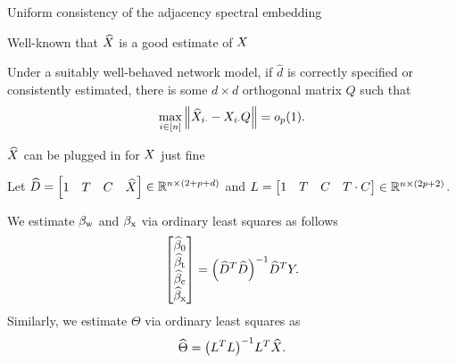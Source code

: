 \documentclass{beamer}
\theoremstyle{remark}
\begin{document}
\begin{frame}{Uniform consistency of the adjacency spectral embedding}

    Well-known that $\widehat{X}$ is a good estimate of $X$

    \begin{lemma}

        Under a suitably well-behaved network model, if $\widehat{d}$ is correctly specified or consistently estimated, there is some $d \times d$ orthogonal matrix $Q$ such that
        \begin{equation*}
            \max_{i \in [n]} \, \norm*{\Xhat_{i \cdot} - \X_{i \cdot} Q} = \op{1}.
        \end{equation*}

    \end{lemma}

\end{frame}


\begin{frame}{$\widehat{X}$ can be plugged in for $X$ just fine}

    Let $\widehat{D} = \begin{bmatrix} 1 & T & C  & \widehat{X} \end{bmatrix} \in \mathbb{R}^{n \times (2 + p + d)}$ and $L = \begin{bmatrix} 1 & T & C  & T \cdot C \end{bmatrix} \in \mathbb{R}^{n \times (2 p + 2)}$.

    We estimate $\beta_\text{w}$ and $\beta_\text{x}$ via ordinary least squares as follows
    \begin{equation*}
        \begin{bmatrix}
            \betazerohat \\
            \betathat    \\
            \betachat    \\
            \betaxhat
        \end{bmatrix}
        = \paren*{\Dhat^T \Dhat}^{-1} \Dhat^T Y.
    \end{equation*}
    Similarly, we estimate $\Theta$ via ordinary least squares as
    \begin{equation*}
        \Thetahat
        = \paren*{\Wfull^T \Wfull}^{-1} \Wfull^T \Xhat.
    \end{equation*}
\end{frame}
\end{document}
